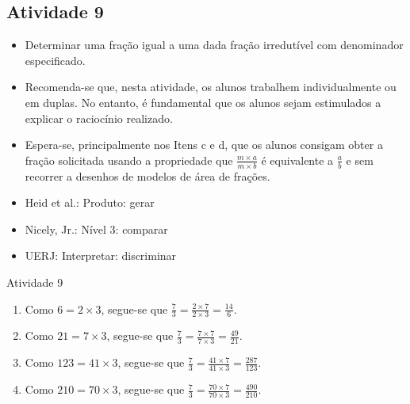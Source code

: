 \begin{multicols}{2}
\subsection{Atividade 9}

\begin{itemize} %
    \item       Determinar uma fração igual a uma dada fração irredutível com 
denominador especificado.
\end{itemize} %
  
  
 
  
\begin{itemize} %
    \item       Recomenda-se que, nesta atividade, os alunos trabalhem 
individualmente ou em duplas. No entanto, é fundamental que os alunos sejam 
estimulados a explicar o raciocínio realizado.
    \item       Espera-se, principalmente nos Itens c e d, que os alunos 
consigam obter a fração solicitada usando a propriedade que       $\frac{m 
\times a}{m \times b}$       é equivalente a       $\frac{a}{b}$       e sem 
recorrer a desenhos de modelos de área de frações.
\end{itemize} %
  
  
   \vspace{.1cm}
  
 \vspace{.1cm}
   
\begin{itemize} %
    \item       Heid et al.: Produto: gerar
    \item       Nicely, Jr.: Nível 3: comparar
    \item       UERJ: Interpretar: discriminar
\end{itemize} %


\begin{resposta*}{Atividade 9}
\begin{enumerate} [\quad a)] %
    \item       Como       $6 = 2 \times 3$, segue-se que       $\frac{7}{3} = 
\frac{2 \times 7}{2 \times 3} = \frac{14}{6}$.
    \item       Como       $21 = 7 \times 3$, segue-se que       $\frac{7}{3} = 
\frac{7 \times 7}{7 \times 3} = \frac{49}{21}$.
    \item       Como       $123 = 41 \times 3$, segue-se que       $\frac{7}{3} 
= \frac{41 \times 7}{41 \times 3} = \frac{287}{123}$.
    \item       Como       $210 = 70 \times 3$, segue-se que       $\frac{7}{3} 
= \frac{70 \times 7}{70 \times 3} = \frac{490}{210}$.
\end{enumerate} %
\end{resposta*}


\end{multicols}
